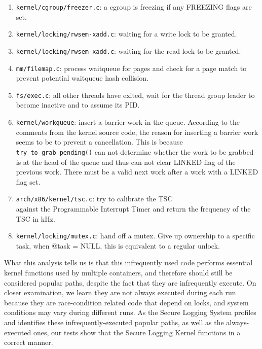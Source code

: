 \begin{enumerate}
	\item \verb|kernel/cgroup/freezer.c|: a cgroup is freezing if any FREEZING flags are set.
	\item \verb|kernel/locking/rwsem-xadd.c|: waiting for a write lock to be granted. 
	\item \verb|kernel/locking/rwsem-xadd.c|: waiting for the read lock to be granted.
	\item \verb|mm/filemap.c|: process waitqueue for pages and check for a page match to prevent potential waitqueue hash collision. 
	\item \verb|fs/exec.c|: all other threads have exited, wait for the thread group leader to become inactive and to assume its PID. 
	\item \verb|kernel/workqueue|: insert a barrier work in the queue. According to the comments from the kernel source code, 
	the reason for inserting a barrier work seems to be to prevent a cancellation. 
	This is because \\
	\verb|try_to_grab_pending()| can not determine whether the work to be grabbed is at the head of the queue and thus can not clear LINKED flag of the previous work. 
	There must be a valid next work after a work with a LINKED flag set. 
	\item \verb|arch/x86/kernel/tsc.c|: try to calibrate the TSC \\ 
	against the Programmable Interrupt Timer and return the frequency of the TSC in kHz. 
	\item \verb|kernel/locking/mutex.c|: hand off a mutex. Give up ownership to a specific task, when @task = NULL, this is equivalent to a regular unlock.
\end{enumerate}

What this analysis tells us is that this infrequently used code performs essential kernel functions used by multiple containers, and therefore should still be considered popular paths, 
despite the fact that they are infrequently execute. 
On closer examination, we learn they are not always executed during each run because they are race-condition related code that depend on locks, and system conditions may vary during different runs. 
As the Secure Logging System profiles and identifies these infrequently-executed popular paths, as well as the always-executed ones, 
our tests show that the Secure Logging Kernel functions in a correct manner.

